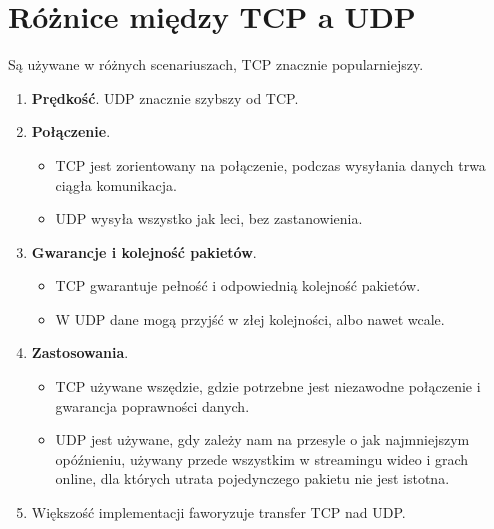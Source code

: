 \section{Różnice między TCP a UDP}
Są używane w różnych scenariuszach, TCP znacznie popularniejszy.
\begin{enumerate}
	\item \textbf{Prędkość}. UDP znacznie szybszy od TCP.
	\item \textbf{Połączenie}.
	      \begin{itemize}
		      \item TCP jest zorientowany na połączenie, podczas wysyłania danych trwa ciągła komunikacja.
		      \item UDP wysyła wszystko jak leci, bez zastanowienia.
	      \end{itemize}
	\item \textbf{Gwarancje i kolejność pakietów}.
	      \begin{itemize}
		      \item TCP gwarantuje pełność i odpowiednią kolejność pakietów.
		      \item W UDP dane mogą przyjść w złej kolejności, albo nawet wcale.
	      \end{itemize}
	\item \textbf{Zastosowania}.
	      \begin{itemize}
		      \item TCP używane wszędzie, gdzie potrzebne jest niezawodne połączenie i gwarancja poprawności danych.
		      \item UDP jest używane, gdy zależy nam na przesyle o jak najmniejszym opóźnieniu, używany przede wszystkim w streamingu wideo i grach online, dla których utrata pojedynczego pakietu nie jest istotna.
	      \end{itemize}
	\item Większość implementacji faworyzuje transfer TCP nad UDP.
\end{enumerate}
